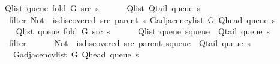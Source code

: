 \begin{isabellebody}
\ \ \ \ {\isachardoublequoteopen}Q{\isacharunderscore}{\kern0pt}list\ {\isacharparenleft}{\kern0pt}queue\ {\isacharparenleft}{\kern0pt}fold\ G\ src\ s{\isacharparenright}{\kern0pt}{\isacharparenright}{\kern0pt}\ {\isacharequal}{\kern0pt}\isanewline
\ \ \ \ \ Q{\isacharunderscore}{\kern0pt}list\ {\isacharparenleft}{\kern0pt}Q{\isacharunderscore}{\kern0pt}tail\ {\isacharparenleft}{\kern0pt}queue\ s{\isacharparenright}{\kern0pt}{\isacharparenright}{\kern0pt}\ {\isacharat}{\kern0pt}\isanewline
\ \ \ \ \ filter\ {\isacharparenleft}{\kern0pt}Not\ {\isasymcirc}\ is{\isacharunderscore}{\kern0pt}discovered\ src\ {\isacharparenleft}{\kern0pt}parent\ s{\isacharparenright}{\kern0pt}{\isacharparenright}{\kern0pt}\ {\isacharparenleft}{\kern0pt}G{\isachardot}{\kern0pt}adjacency{\isacharunderscore}{\kern0pt}list\ G\ {\isacharparenleft}{\kern0pt}Q{\isacharunderscore}{\kern0pt}head\ {\isacharparenleft}{\kern0pt}queue\ s{\isacharparenright}{\kern0pt}{\isacharparenright}{\kern0pt}{\isacharparenright}{\kern0pt}{\isachardoublequoteclose}\isanewline
%
\isadelimproof
%
\endisadelimproof
%
\isatagproof
{}\isamarkupfalse%
\ {\isacharminus}{\kern0pt}\isanewline
\ \ \isamarkupfalse%
\isanewline
\ \ \ \ {\isachardoublequoteopen}Q{\isacharunderscore}{\kern0pt}list\ {\isacharparenleft}{\kern0pt}queue\ {\isacharparenleft}{\kern0pt}fold\ G\ src\ s{\isacharparenright}{\kern0pt}{\isacharparenright}{\kern0pt}\ {\isacharequal}{\kern0pt}\isanewline
\ \ \ \ \ Q{\isacharunderscore}{\kern0pt}list\ {\isacharparenleft}{\kern0pt}queue\ {\isacharparenleft}{\kern0pt}s{\isasymlparr}queue\ {\isacharcolon}{\kern0pt}{\isacharequal}{\kern0pt}\ Q{\isacharunderscore}{\kern0pt}tail\ {\isacharparenleft}{\kern0pt}queue\ s{\isacharparenright}{\kern0pt}{\isasymrparr}{\isacharparenright}{\kern0pt}{\isacharparenright}{\kern0pt}\ {\isacharat}{\kern0pt}\isanewline
\ \ \ \ \ filter\isanewline
\ \ \ \ \ \ {\isacharparenleft}{\kern0pt}Not\ {\isasymcirc}\ is{\isacharunderscore}{\kern0pt}discovered\ src\ {\isacharparenleft}{\kern0pt}parent\ {\isacharparenleft}{\kern0pt}s{\isasymlparr}queue\ {\isacharcolon}{\kern0pt}{\isacharequal}{\kern0pt}\ Q{\isacharunderscore}{\kern0pt}tail\ {\isacharparenleft}{\kern0pt}queue\ s{\isacharparenright}{\kern0pt}{\isasymrparr}{\isacharparenright}{\kern0pt}{\isacharparenright}{\kern0pt}{\isacharparenright}{\kern0pt}\isanewline
\ \ \ \ \ \ {\isacharparenleft}{\kern0pt}G{\isachardot}{\kern0pt}adjacency{\isacharunderscore}{\kern0pt}list\ G\ {\isacharparenleft}{\kern0pt}Q{\isacharunderscore}{\kern0pt}head\ {\isacharparenleft}{\kern0pt}queue\ s{\isacharparenright}{\kern0pt}{\isacharparenright}{\kern0pt}{\isacharparenright}{\kern0pt}{\isachardoublequoteclose}\isanewline

\end{isabellebody}
